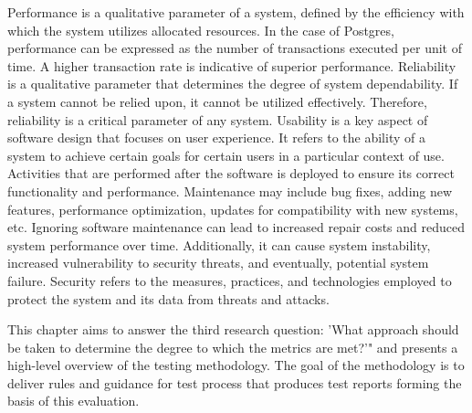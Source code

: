 Performance is a qualitative parameter of a system, defined by the efficiency with which the system utilizes allocated resources. In the case of Postgres, performance can be expressed as the number of transactions executed per unit of time. A higher transaction rate is indicative of superior performance.
Reliability is a qualitative parameter that determines the degree of system dependability. If a system cannot be relied upon, it cannot be utilized effectively. Therefore, reliability is a critical parameter of any system.
Usability is a key aspect of software design that focuses on user experience. It refers to the ability of a system to achieve certain goals for certain users in a particular context of use.
Activities that are performed after the software is deployed to ensure its correct functionality and performance. Maintenance may include bug fixes, adding new features, performance optimization, updates for compatibility with new systems, etc. Ignoring software maintenance can lead to increased repair costs and reduced system performance over time. Additionally, it can cause system instability, increased vulnerability to security threats, and eventually, potential system failure.
Security refers to the measures, practices, and technologies employed to protect the system and its data from threats and attacks.


This chapter aims to answer the third research question: 'What approach should be taken to determine the degree to which the metrics are
met?'" and presents a high-level overview of the testing methodology. The goal of the methodology is to deliver rules and guidance for test process that produces test reports forming the basis of this evaluation.

